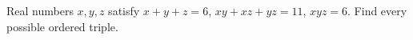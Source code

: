 Real numbers $x,y,z$ satisfy $x+y+z=6$, $xy+xz+yz=11$, $xyz=6$. Find every possible ordered triple.
